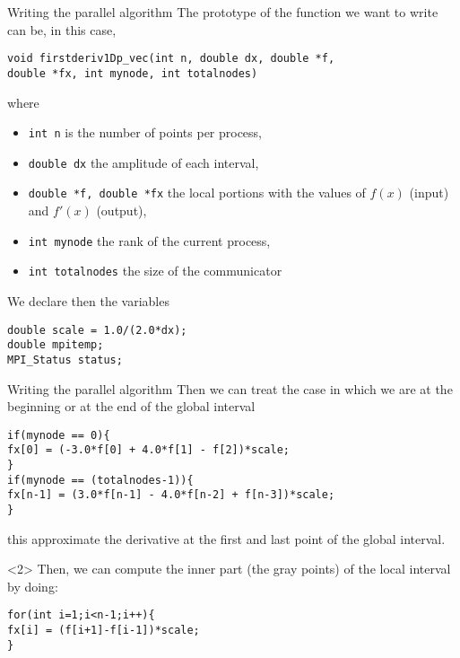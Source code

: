 \documentclass[xcolor={svgnames,usenames}]{beamer}
\begin{document}
\begin{frame}[fragile]{Writing the parallel algorithm}
The prototype of the function we want to write can be, in this case, 
\begin{verbatim}
void firstderiv1Dp_vec(int n, double dx, double *f,
double *fx, int mynode, int totalnodes)
\end{verbatim}
where
\begin{itemize}
\item \texttt{int n} is the number of points per process,
\item \texttt{double dx} the amplitude of each interval,
\item \texttt{double *f, double *fx} the local portions with the values of $f(x)$ (input) and $f'(x)$ (output),
\item \texttt{int mynode} the rank of the current process,
\item \texttt{int totalnodes} the size of the communicator
\end{itemize}
We declare then the variables
\begin{verbatim}
double scale = 1.0/(2.0*dx);
double mpitemp;
MPI_Status status;
\end{verbatim}
\end{frame}

\begin{frame}[fragile]{Writing the parallel algorithm}
Then we can treat the case in which we are at the beginning or at the end of the global interval
\begin{verbatim}
if(mynode == 0){
fx[0] = (-3.0*f[0] + 4.0*f[1] - f[2])*scale;
}
if(mynode == (totalnodes-1)){
fx[n-1] = (3.0*f[n-1] - 4.0*f[n-2] + f[n-3])*scale;
}
\end{verbatim}
this approximate the derivative at the first and last point of the global interval. 
\vfill

\begin{onlyenv}<2>
Then, we can compute the inner part (the gray points) of the local interval by doing:
\begin{verbatim}
for(int i=1;i<n-1;i++){
fx[i] = (f[i+1]-f[i-1])*scale;
}
\end{verbatim}
\end{onlyenv}
\end{frame}
\end{document}
